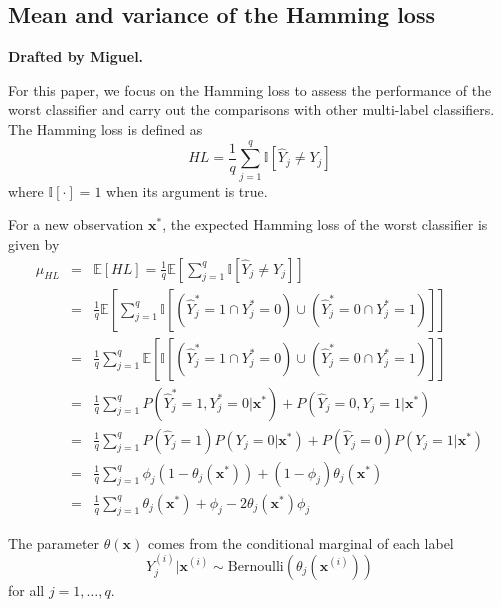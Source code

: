 \documentclass[review]{elsarticle}
\begin{document}
\subsection{Mean and variance of the Hamming loss}\label{ss:Hamming}

{\bf Drafted by Miguel.}

For this paper, we focus on the Hamming loss to assess the performance of the worst classifier and carry out the comparisons with other multi-label classifiers. The Hamming loss is defined as
\begin{equation}
HL = \frac{1}{q} \sum^{q}_{j=1}{\mathbb{I} [\hat{Y}_{j} \neq Y_{j}]}
\end{equation}
where $\mathbb{I}[\cdot] = 1$ when its argument is true.

For a new observation $\mathbf{x}^{*}$, the expected Hamming loss of the worst classifier is given by
\begin{eqnarray*}
\mu_{HL} &=& \mathbb{E}[HL] = \frac{1}{q} \mathbb{E} \left[ \sum^{q}_{j=1}{\mathbb{I} [\hat{Y}_{j} \neq Y_{j}]} \right] \\
&=& \frac{1}{q} \mathbb{E} \left[ \sum^{q}_{j=1}{\mathbb{I} [(\hat{Y}^{*}_{j} = 1 \cap Y^{*}_{j} = 0) \cup (\hat{Y}^{*}_{j} = 0 \cap Y^{*}_{j} = 1) ]} \right] \\
&=& \frac{1}{q} \sum^{q}_{j=1}{\mathbb{E} \left[ \mathbb{I} [(\hat{Y}^{*}_{j} = 1 \cap Y^{*}_{j} = 0) \cup (\hat{Y}^{*}_{j} = 0 \cap Y^{*}_{j} = 1) ] \right]} \\
&=& \frac{1}{q} \sum^{q}_{j=1}{P(\hat{Y}^{*}_{j}=1,Y^{*}_{j}=0|\mathbf{x}^{*}) + P(\hat{Y}_{j}=0,Y_{j}=1|\mathbf{x}^{*})} \\
& = & \frac{1}{q} \sum^{q}_{j=1}{P(\hat{Y}_{j}=1)P(Y_{j}=0|\mathbf{x}^{*}) + P(\hat{Y}_{j}=0)P(Y_{j}=1|\mathbf{x}^{*})}  \\
&=& \frac{1}{q} \sum^{q}_{j=1} \phi_{j} (1 - \theta_{j}(\mathbf{x}^{*})) + (1 - \phi_{j})\theta_{j}(\mathbf{x}^{*}) \\
&=&  \frac{1}{q} \sum^{q}_{j=1}{\theta_{j}(\mathbf{x}^{*}) + \phi_{j} - 2 \theta_{j}(\mathbf{x}^{*}) \phi_{j}}
\end{eqnarray*}

The parameter $\theta(\mathbf{x})$ comes from the conditional marginal of each label
\begin{equation}
Y^{(i)}_{j}| \mathbf{x}^{(i)} \sim \mathrm{Bernoulli}(\theta_{j}(\mathbf{x}^{(i)}))
\end{equation}
for all $j = 1,\ldots,q$.
\end{document}
